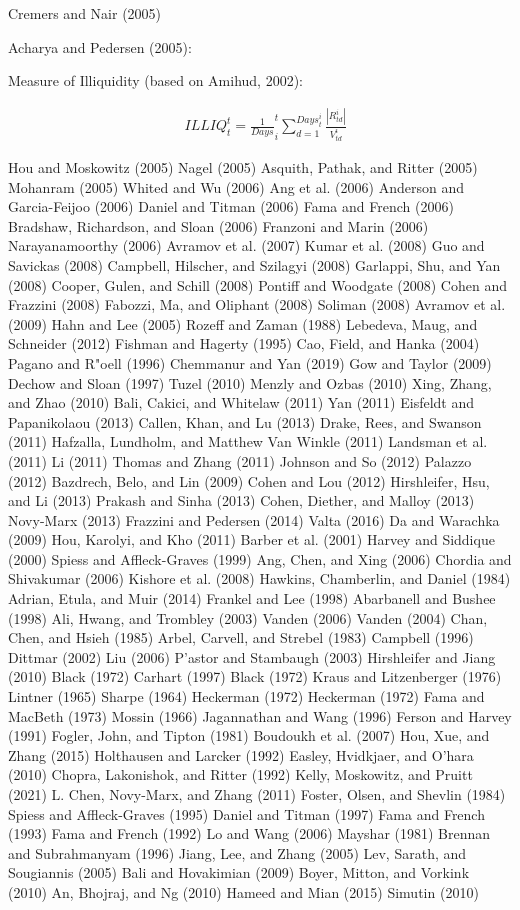 \documentclass[
  letterpaper,
  DIV=11,
  numbers=noendperiod]{scrreprt}
\begin{document}
Cremers and Nair (2005)

Acharya and Pedersen (2005):

Measure of Illiquidity (based on Amihud, 2002):

\begin{align}
&ILLIQ_t^t=\frac{1}{Days}_i^t \sum_{d=1}^{Days_t^i} \frac{|R_{td}^i|}{V_{td}^i}
\end{align}
\label{Equation:acharya2005assetEquation11}

Hou and Moskowitz (2005) Nagel (2005) Asquith, Pathak, and Ritter (2005)
Mohanram (2005) Whited and Wu (2006) Ang et al. (2006) Anderson and
Garcia-Feijoo (2006) Daniel and Titman (2006) Fama and French (2006)
Bradshaw, Richardson, and Sloan (2006) Franzoni and Marin (2006)
Narayanamoorthy (2006) Avramov et al. (2007) Kumar et al. (2008) Guo and
Savickas (2008) Campbell, Hilscher, and Szilagyi (2008) Garlappi, Shu,
and Yan (2008) Cooper, Gulen, and Schill (2008) Pontiff and Woodgate
(2008) Cohen and Frazzini (2008) Fabozzi, Ma, and Oliphant (2008)
Soliman (2008) Avramov et al. (2009) Hahn and Lee (2005) Rozeff and
Zaman (1988) Lebedeva, Maug, and Schneider (2012) Fishman and Hagerty
(1995) Cao, Field, and Hanka (2004) Pagano and R"oell (1996) Chemmanur
and Yan (2019) Gow and Taylor (2009) Dechow and Sloan (1997) Tuzel
(2010) Menzly and Ozbas (2010) Xing, Zhang, and Zhao (2010) Bali,
Cakici, and Whitelaw (2011) Yan (2011) Eisfeldt and Papanikolaou (2013)
Callen, Khan, and Lu (2013) Drake, Rees, and Swanson (2011) Hafzalla,
Lundholm, and Matthew Van Winkle (2011) Landsman et al. (2011) Li (2011)
Thomas and Zhang (2011) Johnson and So (2012) Palazzo (2012) Bazdrech,
Belo, and Lin (2009) Cohen and Lou (2012) Hirshleifer, Hsu, and Li
(2013) Prakash and Sinha (2013) Cohen, Diether, and Malloy (2013)
Novy-Marx (2013) Frazzini and Pedersen (2014) Valta (2016) Da and
Warachka (2009) Hou, Karolyi, and Kho (2011) Barber et al. (2001) Harvey
and Siddique (2000) Spiess and Affleck-Graves (1999) Ang, Chen, and Xing
(2006) Chordia and Shivakumar (2006) Kishore et al. (2008) Hawkins,
Chamberlin, and Daniel (1984) Adrian, Etula, and Muir (2014) Frankel and
Lee (1998) Abarbanell and Bushee (1998) Ali, Hwang, and Trombley (2003)
Vanden (2006) Vanden (2004) Chan, Chen, and Hsieh (1985) Arbel, Carvell,
and Strebel (1983) Campbell (1996) Dittmar (2002) Liu (2006) P'astor and
Stambaugh (2003) Hirshleifer and Jiang (2010) Black (1972) Carhart
(1997) Black (1972) Kraus and Litzenberger (1976) Lintner (1965) Sharpe
(1964) Heckerman (1972) Heckerman (1972) Fama and MacBeth (1973) Mossin
(1966) Jagannathan and Wang (1996) Ferson and Harvey (1991) Fogler,
John, and Tipton (1981) Boudoukh et al. (2007) Hou, Xue, and Zhang
(2015) Holthausen and Larcker (1992) Easley, Hvidkjaer, and O'hara
(2010) Chopra, Lakonishok, and Ritter (1992) Kelly, Moskowitz, and
Pruitt (2021) L. Chen, Novy-Marx, and Zhang (2011) Foster, Olsen, and
Shevlin (1984) Spiess and Affleck-Graves (1995) Daniel and Titman (1997)
Fama and French (1993) Fama and French (1992) Lo and Wang (2006) Mayshar
(1981) Brennan and Subrahmanyam (1996) Jiang, Lee, and Zhang (2005) Lev,
Sarath, and Sougiannis (2005) Bali and Hovakimian (2009) Boyer, Mitton,
and Vorkink (2010) An, Bhojraj, and Ng (2010) Hameed and Mian (2015)
Simutin (2010)
\end{document}

